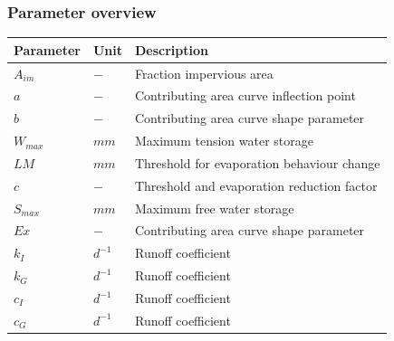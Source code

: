 \subsubsection{Parameter overview}
\begin{table}[htbp]
  \centering
    \begin{tabular}{lll}
    \toprule
    Parameter & Unit  & Description \\
    \midrule
    $A_{im}$ & $-$   & Fraction impervious area \\
    $a$   & $-$   & Contributing area curve inflection point \\
    $b$   & $-$   & Contributing area curve shape parameter \\
    $W_{max}$ & $mm$  & Maximum tension water storage \\
    $LM$  & $mm$  & Threshold for evaporation behaviour change \\
    $c$   & $-$   & Threshold and evaporation reduction factor \\
    $S_{max}$ & $mm$  & Maximum free water storage \\
    $Ex$  & $-$   & Contributing area curve shape parameter \\
    $k_I$ & $d^{-1}$ & Runoff coefficient \\
    $k_G$ & $d^{-1}$ & Runoff coefficient \\
    $c_I$ & $d^{-1}$ & Runoff coefficient \\
    $c_G$ & $d^{-1}$ & Runoff coefficient \\
    \bottomrule
    \end{tabular}%
  \label{tab:addlabel}%
\end{table}%
